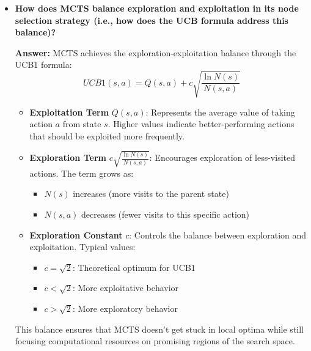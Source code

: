 \begin{itemize}
    \item \textbf{How does MCTS balance exploration and exploitation in its node selection strategy (i.e., how does the UCB formula address this balance)?}
    
    \textbf{Answer:} MCTS achieves the exploration-exploitation balance through the UCB1 formula:
    \[UCB1(s,a) = Q(s,a) + c\sqrt{\frac{\ln N(s)}{N(s,a)}}\]
    
    \begin{itemize}
        \item \textbf{Exploitation Term} $Q(s,a)$: Represents the average value of taking action $a$ from state $s$. Higher values indicate better-performing actions that should be exploited more frequently.
        
        \item \textbf{Exploration Term} $c\sqrt{\frac{\ln N(s)}{N(s,a)}}$: Encourages exploration of less-visited actions. The term grows as:
        \begin{itemize}
            \item $N(s)$ increases (more visits to the parent state)
            \item $N(s,a)$ decreases (fewer visits to this specific action)
        \end{itemize}
        
        \item \textbf{Exploration Constant} $c$: Controls the balance between exploration and exploitation. Typical values:
        \begin{itemize}
            \item $c = \sqrt{2}$: Theoretical optimum for UCB1
            \item $c < \sqrt{2}$: More exploitative behavior
            \item $c > \sqrt{2}$: More exploratory behavior
        \end{itemize}
    \end{itemize}
    
    This balance ensures that MCTS doesn't get stuck in local optima while still focusing computational resources on promising regions of the search space.
\end{itemize}

